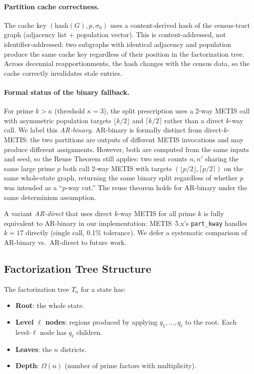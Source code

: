 \paragraph{Partition cache correctness.}
The cache key $(\text{hash}(G), p, \sigma_0)$ uses a content-derived hash
of the census-tract graph (adjacency list + population vector). This is
content-addressed, not identifier-addressed: two subgraphs with identical
adjacency and population produce the same cache key regardless of their
position in the factorization tree. Across decennial reapportionments,
the hash changes with the census data, so the cache correctly invalidates
stale entries.

\paragraph{Formal status of the binary fallback.}
For prime $k > \kappa$ (threshold $\kappa = 3$), the split prescription uses
a 2-way METIS call with asymmetric population targets $\lfloor k/2 \rfloor$
and $\lceil k/2 \rceil$ rather than a direct $k$-way call. We label this
\emph{AR-binary}. AR-binary is formally distinct from direct-$k$-METIS:
the two partitions are outputs of different METIS invocations and may produce
different assignments. However, both are computed from the same inputs and
seed, so the Reuse Theorem still applies: two seat counts $n, n'$ sharing the
same large prime $p$ both call 2-way METIS with targets $(\lfloor p/2 \rfloor,
\lceil p/2 \rceil)$ on the same whole-state graph, returning the same binary
split regardless of whether $p$ was intended as a ``$p$-way cut.'' The reuse
theorem holds for AR-binary under the same determinism assumption.

A variant \emph{AR-direct} that uses direct $k$-way METIS for all prime $k$
is fully equivalent to AR-binary in our implementation: METIS~5.x's
\texttt{part\_kway} handles $k = 17$ directly (single call, 0.1\% tolerance).
We defer a systematic comparison of AR-binary vs.\ AR-direct to future work.

\subsection{Factorization Tree Structure}
\label{sec:tree}

The factorization tree $T_n$ for a state has:
\begin{itemize}
  \item \textbf{Root}: the whole state.
  \item \textbf{Level $\ell$ nodes}: regions produced by applying $q_1, \ldots,
        q_\ell$ to the root. Each level-$\ell$ node has $q_\ell$ children.
  \item \textbf{Leaves}: the $n$ districts.
  \item \textbf{Depth}: $\Omega(n)$ (number of prime factors with multiplicity).
\end{itemize}

